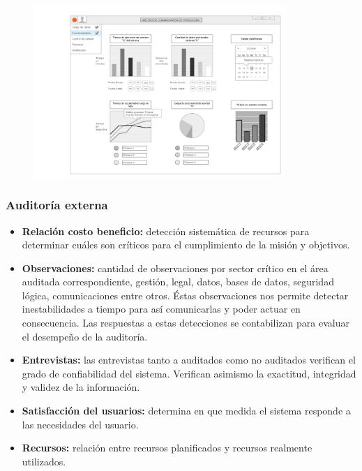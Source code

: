	\begin{figure}[h]
	  \centering
  	  \includegraphics[width=0.85\textwidth]{img/tp2_integrador/area_produccion}
      \label{Área de producción}
	\end{figure}
    
    \subsubsection{Auditoría externa}
    	\begin{itemize}
        	\item\textbf{Relación costo beneficio: }detección sistemática de recursos para determinar cuáles son críticos para el cumplimiento de la misión y objetivos.
            \item\textbf{Observaciones: } cantidad de observaciones por sector crítico en el área auditada correspondiente, gestión, legal, datos, bases de datos, seguridad lógica, comunicaciones entre otros. Éstas observaciones nos permite detectar inestabilidades a tiempo para así comunicarlas y poder actuar en consecuencia. Las respuestas a estas detecciones se contabilizan para evaluar el desempeño de la auditoría.
            \item\textbf{Entrevistas: } las entrevistas tanto a auditados como no auditados verifican el grado de confiabilidad del sistema. Verifican asimismo la exactitud, integridad y validez de la información.
			\item\textbf{Satisfacción del usuarios: } determina en que medida el sistema responde a las necesidades del usuario.
            \item\textbf{Recursos: } relación entre recursos planificados y recursos realmente utilizados.
		\end{itemize}    
    
